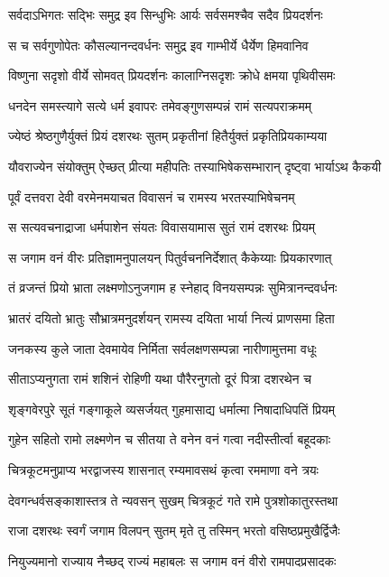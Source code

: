 \twolineshloka
{सर्वदाऽभिगतः सद्भिः समुद्र इव सिन्धुभिः}
{आर्यः सर्वसमश्चैव सदैव प्रियदर्शनः}%

\twolineshloka
{स च सर्वगुणोपेतः कौसल्यानन्दवर्धनः}
{समुद्र इव गाम्भीर्ये धैर्येण हिमवानिव}%

\twolineshloka
{विष्णुना सदृशो वीर्ये सोमवत् प्रियदर्शनः}
{कालाग्निसदृशः क्रोधे क्षमया पृथिवीसमः}%

\twolineshloka
{धनदेन समस्त्यागे सत्ये धर्म इवापरः}
{तमेवङ्गुणसम्पन्नं रामं सत्यपराक्रमम्}%

\twolineshloka
{ज्येष्ठं श्रेष्ठगुणैर्युक्तं प्रियं दशरथः सुतम्}
{प्रकृतीनां हितैर्युक्तं प्रकृतिप्रियकाम्यया}%

\twolineshloka
{यौवराज्येन संयोक्तुम् ऐच्छत् प्रीत्या महीपतिः}
{तस्याभिषेकसम्भारान् दृष्ट्वा भार्याऽथ कैकयी}%

\twolineshloka
{पूर्वं दत्तवरा देवी वरमेनमयाचत}
{विवासनं च रामस्य भरतस्याभिषेचनम्}%

\twolineshloka
{स सत्यवचनाद्राजा धर्मपाशेन संयतः}
{विवासयामास सुतं रामं दशरथः प्रियम्}%

\twolineshloka
{स जगाम वनं वीरः प्रतिज्ञामनुपालयन्}
{पितुर्वचननिर्देशात् कैकेय्याः प्रियकारणात्}%

\twolineshloka
{तं व्रजन्तं प्रियो भ्राता लक्ष्मणोऽनुजगाम ह}
{स्नेहाद् विनयसम्पन्नः सुमित्रानन्दवर्धनः}%

\twolineshloka
{भ्रातरं दयितो भ्रातुः सौभ्रात्रमनुदर्शयन्}
{रामस्य दयिता भार्या नित्यं प्राणसमा हिता}%

\twolineshloka
{जनकस्य कुले जाता देवमायेव निर्मिता}
{सर्वलक्षणसम्पन्ना नारीणामुत्तमा वधूः}%

\twolineshloka
{सीताऽप्यनुगता रामं शशिनं रोहिणी यथा}
{पौरैरनुगतो दूरं पित्रा दशरथेन च}%

\twolineshloka
{शृङ्गवेरपुरे सूतं गङ्गाकूले व्यसर्जयत्}
{गुहमासाद्य धर्मात्मा निषादाधिपतिं प्रियम्}%

\twolineshloka
{गुहेन सहितो रामो लक्ष्मणेन च सीतया}
{ते वनेन वनं गत्वा नदीस्तीर्त्वा बहूदकाः}%

\twolineshloka
{चित्रकूटमनुप्राप्य भरद्वाजस्य शासनात्}
{रम्यमावसथं कृत्वा रममाणा वने त्रयः}%

\twolineshloka
{देवगन्धर्वसङ्काशास्तत्र ते न्यवसन् सुखम्}
{चित्रकूटं गते रामे पुत्रशोकातुरस्तथा}%

\twolineshloka
{राजा दशरथः स्वर्गं जगाम विलपन् सुतम्}
{मृते तु तस्मिन् भरतो वसिष्ठप्रमुखैर्द्विजैः}%

\twolineshloka
{नियुज्यमानो राज्याय नैच्छद् राज्यं महाबलः}
{स जगाम वनं वीरो रामपादप्रसादकः}%

